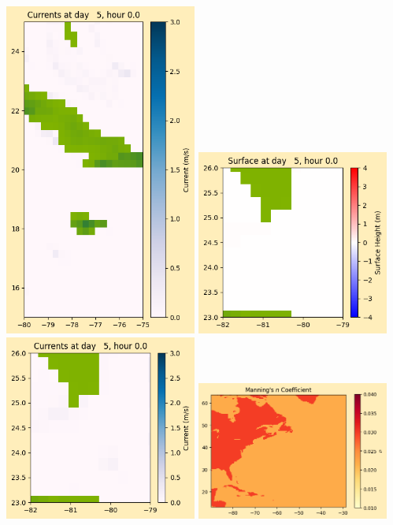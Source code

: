\documentclass[11pt]{article}
\begin{document}
\includegraphics[width=0.475\textwidth]{frame0032fig1008.png}
\vskip 10pt 
\includegraphics[width=0.475\textwidth]{frame0032fig1009.png}
\includegraphics[width=0.475\textwidth]{frame0032fig1010.png}
\vskip 10pt 
\includegraphics[width=0.475\textwidth]{frame0032fig1011.png}
\end{document}
